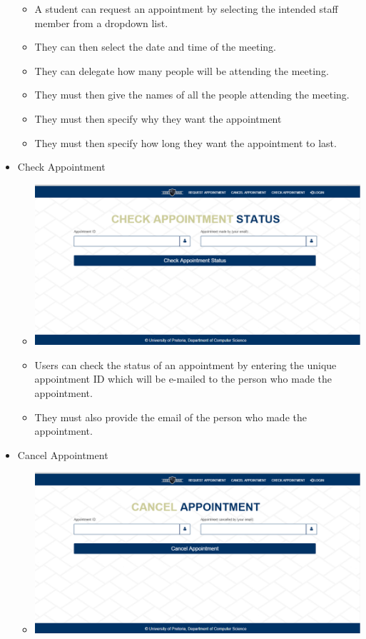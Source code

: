 \begin{itemize}
\begin{itemize}
				\item A student can request an appointment by selecting the intended staff member from a dropdown list.
				\item They can then select the date and time of the meeting.
				\item They can delegate how many people will be attending the meeting.
				\item They must then give the names of all the people attending the meeting.
				\item They must then specify why they want the appointment
				\item They must then specify how long they want the appointment to last.
			\end{itemize}
		\item Check Appointment
			\begin{itemize}
				\item \includegraphics[width=\linewidth]{images/Screenshots/CheckAppoint.png}
				\item Users can check the status of an appointment by entering the unique appointment ID which will be e-mailed to the person who made the appointment.
				\item They must also provide the email of the person who made the appointment.
			\end{itemize}
		\item Cancel Appointment
			\begin{itemize}
				\item \includegraphics[width=\linewidth]{images/Screenshots/CancelAppoint.png}

\end{itemize}
\end{itemize}
